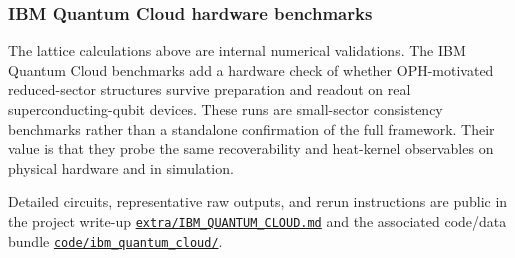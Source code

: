 \subsubsection{IBM Quantum Cloud hardware benchmarks}\label{614a-ibm-quantum-cloud-hardware-benchmarks}

The lattice calculations above are internal numerical validations. The IBM Quantum Cloud benchmarks add a hardware check of whether OPH-motivated reduced-sector structures survive preparation and readout on real superconducting-qubit devices. These runs are small-sector consistency benchmarks rather than a standalone confirmation of the full framework. Their value is that they probe the same recoverability and heat-kernel observables on physical hardware and in simulation.

Detailed circuits, representative raw outputs, and rerun instructions are public in the project write-up \href{https://github.com/FloatingPragma/observer-patch-holography/blob/main/extra/IBM_QUANTUM_CLOUD.md}{\texttt{extra/IBM\_QUANTUM\_CLOUD.md}} and the associated code/data bundle \href{https://github.com/FloatingPragma/observer-patch-holography/tree/main/code/ibm_quantum_cloud}{\texttt{code/ibm\_quantum\_cloud/}}.

